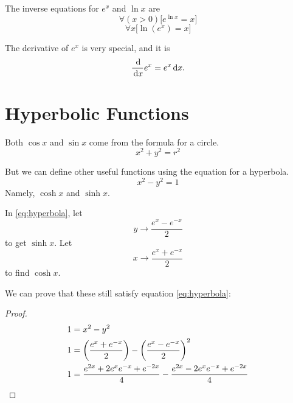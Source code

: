 The inverse equations for $e^x$ and $\ln x$ are
\begin{equation}
  \forall (x>0)\big[e^{\ln x}=x\big]
  \label{eq:exinv1}
\end{equation}
\begin{equation}
  \forall x\big[\ln{(e^x)} =x\big]
  \label{eq:exinv2}
\end{equation}

The derivative of $e^x$ is very special, and it is
\begin{equation}
  \frac{\,\mathrm{d}}{\,\mathrm{d} x} e^x = e^x \,\mathrm{d} x.
  \label{eq:ddxex}
\end{equation}


\section{Hyperbolic Functions}
Both \(\cos x\) and \(\sin x\) come from the formula for a circle.
\begin{equation}
  x^2 + y^2=r^2
  \label{eq:circle}
\end{equation}

But we can define other useful functions using the equation for a hyperbola.
\begin{equation}
  x^2-y^2=1
  \label{eq:hyperbola}
\end{equation}
Namely, \(\cosh x\) and \(\sinh x\).

In \ref{eq:hyperbola}, let \[ y \to \frac{e^x-e^{-x}}{2}\] to get \(\sinh x\).
Let \[ x \to \frac{e^x+e^{-x}}{2}\] to find \(\cosh x\).

We can prove that these still satisfy equation \ref{eq:hyperbola}:

\begin{proof}
  \begin{align*}
    1&=x^2-y^2 \\
    1&=\left( \frac{e^x+e^{-x}}{2} \right) - \left( \frac{e^x - e^{-x}}{2}
    \right)^2 \\
    1&=\frac{e^{2x}+2e^xe^{-x}+e^{-2x}}{4}-\frac{e^{2x}-2e^xe^{-x}+e^{-2x}}{4}
    \qedhere
  \end{align*}
\end{proof}
